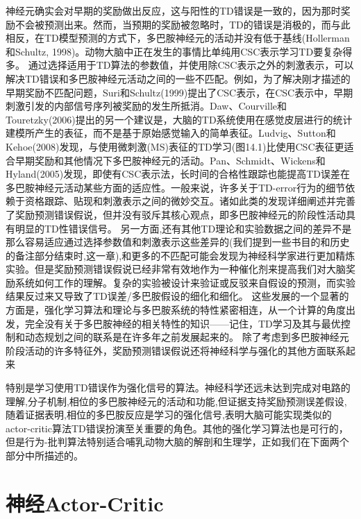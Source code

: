 神经元确实会对早期的奖励做出反应，这与阳性的TD错误是一致的，因为那时奖励不会被预测出来。然而，当预期的奖励被忽略时，TD的错误是消极的，而与此相反，在TD模型预测的方式下，多巴胺神经元的活动并没有低于基线(Hollerman和Schultz, 1998)。动物大脑中正在发生的事情比单纯用CSC表示学习TD要复杂得多。
通过选择适用于TD算法的参数值，并使用除CSC表示之外的刺激表示，可以解决TD错误和多巴胺神经元活动之间的一些不匹配。例如，为了解决刚才描述的早期奖励不匹配问题，Suri和Schultz(1999)提出了CSC表示，在CSC表示中，早期刺激引发的内部信号序列被奖励的发生所抵消。Daw、Courville和Touretzky(2006)提出的另一个建议是，大脑的TD系统使用在感觉皮层进行的统计建模所产生的表征，而不是基于原始感觉输入的简单表征。Ludvig、Sutton和Kehoe(2008)发现，与使用微刺激(MS)表征的TD学习(图14.1)比使用CSC表征更适合早期奖励和其他情况下多巴胺神经元的活动。Pan、Schmidt、Wickens和Hyland(2005)发现，即使有CSC表示法，长时间的合格性跟踪也能提高TD误差在多巴胺神经元活动某些方面的适应性。一般来说，许多关于TD-error行为的细节依赖于资格跟踪、贴现和刺激表示之间的微妙交互。诸如此类的发现详细阐述并完善了奖励预测错误假说，但并没有驳斥其核心观点，即多巴胺神经元的阶段性活动具有明显的TD性错误信号。
另一方面,还有其他TD理论和实验数据之间的差异不是那么容易适应通过选择参数值和刺激表示这些差异的(我们提到一些书目的和历史的备注部分结束时,这一章),和更多的不匹配可能会发现为神经科学家进行更加精炼实验。但是奖励预测错误假说已经非常有效地作为一种催化剂来提高我们对大脑奖励系统如何工作的理解。复杂的实验被设计来验证或反驳来自假设的预测，而实验结果反过来又导致了TD误差/多巴胺假设的细化和细化。
这些发展的一个显著的方面是，强化学习算法和理论与多巴胺系统的特性紧密相连，从一个计算的角度出发，完全没有关于多巴胺神经的相关特性的知识——记住，TD学习及其与最优控制和动态规划之间的联系是在许多年之前发展起来的。
除了考虑到多巴胺神经元阶段活动的许多特征外，奖励预测错误假说还将神经科学与强化的其他方面联系起来

特别是学习使用TD错误作为强化信号的算法。神经科学还远未达到完成对电路的理解,分子机制,相位的多巴胺神经元的活动和功能,但证据支持奖励预测误差假设,随着证据表明,相位的多巴胺反应是学习的强化信号,表明大脑可能实现类似的actor-critic算法TD错误扮演至关重要的角色。其他的强化学习算法也是可行的，但是行为-批判算法特别适合哺乳动物大脑的解剖和生理学，正如我们在下面两个部分中所描述的。


\section{神经Actor-Critic}

